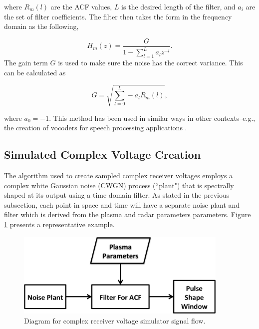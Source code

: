 \documentclass[draft,ras]{agutex}
\begin{document}
\begin{article}
\noindent where $R_m(l)$ are the ACF values, $L$ is the desired length of the filter, and $ a_i$ are the set of filter coefficients. The filter then takes the form in the frequency domain as the following,

\begin{equation}
\label{eq:filtz}
H_m(z) = \frac{G}{1-\displaystyle \sum_{l=1}^{L} a_l z^{-l}}.
\end{equation}
\noindent The gain term $G$ is used to make sure the noise has the correct variance. This can be calculated as 

\begin{equation}
\label{eq:gainterm}
G=\sqrt{\displaystyle \sum_{l=0}^L -a_l R_m(l)},
\end{equation}

\noindent where $a_0=-1$.  This method has been used in similar ways in other contexts--e.g., the creation of vocoders for speech processing applications \citep{rabinerdigitalspeech}.

\subsection{Simulated Complex Voltage Creation}

The algorithm used to create sampled complex receiver voltages employs a complex white Gaussian noise (CWGN) process (``plant") that is spectrally shaped at its output using a time domain filter. As stated in the previous subsection, each point in space and time will have a separate noise plant and filter which is derived from the plasma and radar parameters parameters. Figure \ref{fig:IQdiagram} presents a representative example. 

\begin{figure}[h!]
\centering
\includegraphics[width=4in]{diagrampart}
\caption{Diagram for complex receiver voltage simulator signal flow.}
\label{fig:IQdiagram}
\end{figure}


\end{article}
\end{document}
